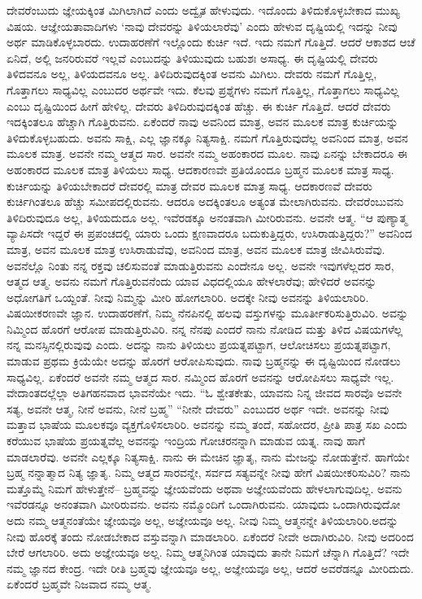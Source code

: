 ದೇವರೆಂಬುದು ಜ್ಞೇಯಕ್ಕಿಂತ ಮಿಗಿಲಾಗಿದೆ ಎಂದು ಅದ್ವೈತ ಹೇಳುವುದು. ಇದೊಂದು ತಿಳಿದುಕೊಳ್ಳಬೇಕಾದ ಮುಖ್ಯ ವಿಷಯ. ಆಜ್ಞೇಯತಾವಾದಿಗಳು ‘ನಾವು ದೇವರನ್ನು ತಿಳಿಯಲಾರೆವು’ ಎಂದು ಹೇಳುವ ದೃಷ್ಟಿಯಲ್ಲಿ ಇದನ್ನು ನೀವು ಅರ್ಥ ಮಾಡಿಕೊಳ್ಳಬಾರದು. ಉದಾಹರಣೆಗೆ ಇಲ್ಲೊಂದು ಕುರ್ಚಿ ಇದೆ. ಇದು ನಮಗೆ ಗೊತ್ತಿದೆ. ಆದರೆ ಆಕಾಶದ ಆಚೆ ಏನಿದೆ, ಅಲ್ಲಿ ಜನರಿರುವರೆ ಇಲ್ಲವೆ ಎಂಬುದನ್ನು ತಿಳಿಯುವುದು ಬಹುಶಃ ಅಸಾಧ್ಯ. ಈ ದೃಷ್ಟಿಯಲ್ಲಿ ದೇವರು ತಿಳಿದವನೂ ಅಲ್ಲ, ತಿಳಿಯದವನೂ ಅಲ್ಲ. ತಿಳಿದಿರುವುದಕ್ಕಿಂತ ಅವನು ಮಿಗಿಲು. ದೇವರು ನಮಗೆ ಗೊತ್ತಿಲ್ಲ, ಗೊತ್ತಾಗಲು ಸಾಧ್ಯವಿಲ್ಲ ಎಂಬುದರ ಅರ್ಥವೇ ಇದು. ಕೆಲವು ಪ್ರಶ್ನೆಗಳು ನಮಗೆ ಗೊತ್ತಿಲ್ಲ, ಗೊತ್ತಾಗಲು ಸಾಧ್ಯವಿಲ್ಲ ಎಂಬು ದೃಷ್ಟಿಯಿಂದ ಹೀಗೆ ಹೇಳಿಲ್ಲ. ದೇವರು ತಿಳಿದಿರುವುದಕ್ಕಿಂತ ಹೆಚ್ಚು. ಈ ಕುರ್ಚಿ ಗೊತ್ತಿದೆ. ಆದರೆ ದೇವರು ಇದಕ್ಕಿಂತಲೂ ಹೆಚ್ಚಾಗಿ ಗೊತ್ತಿರುವನು. ಏಕೆಂದರೆ ನಾವು ಅವನಿಂದ ಮಾತ್ರ, ಅವನ ಮೂಲಕ ಮಾತ್ರ ಕುರ್ಚಿಯನ್ನು ತಿಳಿದುಕೊಳ್ಳಬಹುದು. ಅವನು ಸಾಕ್ಷಿ, ಎಲ್ಲ ಜ್ಞಾನಕ್ಕೂ ನಿತ್ಯಸಾಕ್ಷಿ. ನಮಗೆ ಗೊತ್ತಿರುವುದೆಲ್ಲ ಅವನಿಂದ ಮಾತ್ರ, ಅವನ ಮೂಲಕ ಮಾತ್ರ. ಅವನೇ ನಮ್ಮ ಆತ್ಮದ ಸಾರ. ಅವನೇ ನಮ್ಮ ಅಹಂಕಾರದ ಮೂಲ. ನಾವು ಏನನ್ನು ಬೇಕಾದರೂ ಈ ಅಹಂಕಾರದ ಮೂಲಕ ಮಾತ್ರ ತಿಳಿಯಲು ಸಾಧ್ಯ. ಆದಕಾರಣವೇ ಪ್ರತಿಯೊಂದೂ ಬ್ರಹ್ಮನ ಮೂಲಕ ಮಾತ್ರ ಸಾಧ್ಯ. ಕುರ್ಚಿಯನ್ನು ತಿಳಿಯಬೇಕಾದರೆ ದೇವರಲ್ಲಿ ಮಾತ್ರ ದೇವರ ಮೂಲಕ ಮಾತ್ರ ಸಾಧ್ಯ. ಆದಕಾರಣವೆ ದೇವರು ಕುರ್ಚಿಗಿಂತಲೂ ಹೆಚ್ಚು ಸಮೀಪದಲ್ಲಿರುವನು. ಆದರೂ ಅದಕ್ಕಿಂತಲೂ ಅತ್ಯಂತ ಮೇಲಾಗಿರುವನು. ದೇವರೆಂಬುವನು ತಿಳಿದಿರುವುದೂ ಅಲ್ಲ, ತಿಳಿಯದುದೂ ಅಲ್ಲ. ಇವೆರಡಕ್ಕೂ ಅನಂತವಾಗಿ ಮೀರಿರುವನು. ಅವನೇ ಆತ್ಮ. “ಆ ಪುಣ್ಯಾತ್ಮ ವ್ಯಾಪಿಸದೇ ಇದ್ದರೆ ಈ ಪ್ರಪಂಚದಲ್ಲಿ ಯಾರು ಒಂದು ಕ್ಷಣವಾದರೂ ಬದುಕುತ್ತಿದ್ದರು, ಉಸಿರಾಡುತ್ತಿದ್ದರು?” ಅವನಿಂದ ಮಾತ್ರ, ಅವನ ಮೂಲಕ ಮಾತ್ರ ಉಸಿರಾಡುವೆವು, ಅವನಿಂದ ಮಾತ್ರ, ಅವನ ಮೂಲಕ ಮಾತ್ರ ಜೀವಿಸಿರುವೆವು. ಅವನೆಲ್ಲೊ ನಿಂತು ನನ್ನ ರಕ್ತವು ಚಲಿಸುವಂತೆ ಮಾಡುತ್ತಿರುವನು ಎಂದೇನೂ ಅಲ್ಲ. ಅವನೇ ಇವುಗಳೆಲ್ಲದರ ಸಾರ, ಆತ್ಮದ ಆತ್ಮ. ಅವನು ನಮಗೆ ಗೊತ್ತಿರುವನೆಂದು ಯಾವ ವಿಧದಲ್ಲಿಯೂ ಹೇಳಲಾರೆವು; ಹೇಳಿದರೆ ಅವನನ್ನು ಅಧೋಗತಿಗೆ ಒಯ್ದಂತೆ. ನೀವು ನಿಮ್ಮನ್ನು ಮೀರಿ ಹೋಗಲಾರಿರಿ. ಅದಕ್ಕೇ ನೀವು ಅವನನ್ನು ತಿಳಿಯಲಾರಿರಿ. ವಿಷಯೀಕರಣವೇ ಜ್ಞಾನ. ಉದಾಹರಣೆಗೆ, ನಿಮ್ಮ ನೆನಪಿನಲ್ಲಿ ಹಲವು ವಸ್ತುಗಳನ್ನು ಮೂರ್ತೀಕರಿಸುತ್ತಿರುವಿರಿ. ಅವನ್ನು ನಿಮ್ಮಿಂದ ಹೊರಗೆ ಆರೋಪ ಮಾಡುತ್ತಿರುವಿರಿ. ನನ್ನ ನೆನಪು ಎಂದರೆ ನಾನು ನೋಡಿದ ಮತ್ತು ತಿಳಿದ ವಿಷಯಗಳೆಲ್ಲ ನನ್ನ ಮನಸ್ಸಿನಲ್ಲಿರುವುವು ಎಂದು. ಅದನ್ನು ನಾನು ತಿಳಿಯಲು ಪ್ರಯತ್ನಪಟ್ಟಾಗ, ಆಲೋಚಿಸಲು ಪ್ರಯತ್ನಪಟ್ಟಾಗ, ಮಾಡುವ ಪ್ರಥಮ ಕ್ರಿಯೆಯೇ ಅದನ್ನು ಹೊರಗೆ ಆರೋಪಿಸುವುದು. ನಾವು ಬ್ರಹ್ಮನನ್ನು ಈ ದೃಷ್ಟಿಯಿಂದ ನೋಡಲು ಸಾಧ್ಯವಿಲ್ಲ. ಏಕೆಂದರೆ ಅವನೇ ನಮ್ಮ ಆತ್ಮದ ಸಾರ. ನಮ್ಮಿಂದ ಹೊರಗೆ ಅವನನ್ನು ಆರೋಪಿಸಲು ಸಾಧ್ಯವೇ ಇಲ್ಲ. ವೇದಾಂತದಲ್ಲೆಲ್ಲಾ ಅತಿಗಹನವಾದ ಭಾವನೆಯೇ ಇದು. “ಓ ಶ್ವೇತಕೇತು, ಯಾವನು ನಿನ್ನ ಜೀವದ ಸಾರವೊ ಅವನೇ ಸತ್ಯ, ಅವನೇ ಆತ್ಮ, ನೀನೆ ಅವನು, ನೀನೆ ಬ್ರಹ್ಮ” “ನೀನೇ ದೇವರು” ಎಂಬುದರ ಅರ್ಥ ಇದೇ. ಅವನನ್ನು ನೀವು ಮತ್ತಾವ ಭಾಷೆಯ ಮೂಲಕವೂ ವ್ಯಕ್ತಗೊಳಿಸಲಾರಿರಿ. ಅವನನ್ನು ನಮ್ಮ ತಂದೆ, ಸಹೋದರ, ಪ್ರೀತಿ ಪಾತ್ರ ಸಖ ಎಂದು ಕರೆಯುವ ಭಾಷೆಯ ಪ್ರಯತ್ನವೆಲ್ಲ ಅವನನ್ನು ಇಂದ್ರಿಯ ಗೋಚರನನ್ನಾಗಿ ಮಾಡುವ ಯತ್ನ. ನಾವು ಹಾಗೆ ಮಾಡಲಾರೆವು. ಅವನೇ ಎಲ್ಲಕ್ಕೂ ನಿತ್ಯಸಾಕ್ಷಿ. ನಾನು ಈ ಮೇಚಿನ ಜ್ಞಾತೃ, ನಾನು ಮೇಜನ್ನು ನೋಡುತ್ತೇನೆ. ಹಾಗೆಯೇ ಬ್ರಹ್ಮ ನನ್ನಾತ್ಮಾದ ನಿತ್ಯ ಜ್ಞಾತೃ. ನಿಮ್ಮ ಆತ್ಮದ ಸಾರವನ್ನೇ, ಸರ್ವದ ಸತ್ಯವನ್ನೇ ನೀವು ಹೇಗೆ ವಿಷಯೀಕರಿಸುವಿರಿ? ನಾನು ಮತ್ತೊಮ್ಮೆ ನಿಮಗೆ ಹೇಳುತ್ತೇನೆ– ಬ್ರಹ್ಮವನ್ನು ಜ್ಞೇಯವೆಂದು ಅಥವಾ ಅಜ್ಞೇಯವೆಂದು ಹೇಳಲಾಗುವುದಿಲ್ಲ. ಅವನು ಇವೆರಡನ್ನೂ ಅನಂತವಾಗಿ ಮೀರಿರುವನು. ಅವನು ನಮ್ಮೊಂದಿಗೆ ಒಂದಾಗಿರುವನು. ಯಾವುದು ಒಂದಾಗಿರುವುದೋ ಅದು ನಮ್ಮ ಆತ್ಮನಂತೆಯೇ ಜ್ಞೇಯವೂ ಅಲ್ಲ, ಅಜ್ಞೇಯವೂ ಅಲ್ಲ. ನೀವು ನಿಮ್ಮ ಆತ್ಮನನ್ನೇ ತಿಳಿಯಲಾರಿರಿ.ಅದನ್ನು ನೀವು ಹೊರಕ್ಕೆ ತಂದು ನೋಡಬೇಕಾದ ವಸ್ತುವನ್ನಾಗಿ ಮಾಡಲಾರಿರಿ. ಏಕೆಂದರೆ ನೀವೇ ಅದಾಗಿರುವಿರಿ. ನೀವು ಅದರಿಂದ ಬೇರೆ ಆಗಲಾರಿರಿ. ಅದು ಅಜ್ಞೇಯವೂ ಅಲ್ಲ. ನಿಮ್ಮ ಆತ್ಮನಿಗಿಂತ ಯಾವುದು ತಾನೇ ನಿಮಗೆ ಚೆನ್ನಾಗಿ ಗೊತ್ತಿದೆ? ಇದೇ ನಮ್ಮ ಜ್ಞಾನದ ಕೇಂದ್ರ. ಇದೇ ರೀತಿ ಬ್ರಹ್ಮವು ಜ್ಞೇಯವೂ ಅಲ್ಲ, ಅಜ್ಞೇಯವೂ ಅಲ್ಲ, ಆದರೆ ಅವರೆಡನ್ನೂ ಮೀರಿದುದು. ಏಕೆಂದರೆ ಬ್ರಹ್ಮವೇ ನಿಜವಾದ ನಮ್ಮ ಆತ್ಮ.


